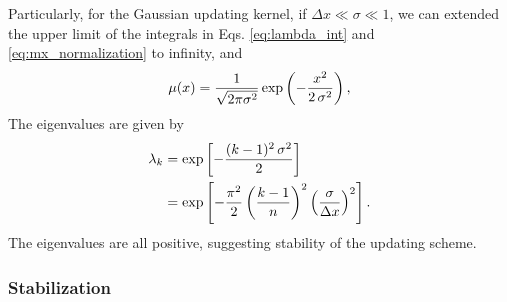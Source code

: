 \documentclass[reprint, floatfix]{revtex4-1}
\begin{document}
Particularly,
for the Gaussian updating kernel,
if $\Delta x \ll \sigma \ll 1$,
we can extended
the upper limit of the integrals
in Eqs. \eqref{eq:lambda_int}
and \eqref{eq:mx_normalization}
to infinity, and
%
\begin{equation}
\mu(x)
=
\frac{            1            }
     { \sqrt{ 2 \pi \sigma^2 } }
%
\exp\left(
      -\frac{       x^2     }
            { 2 \, \sigma^2 }
    \right),
\notag
\end{equation}
%
%
The eigenvalues are given by
%
\begin{align}
\lambda_k
&=
\exp\left[
      -\frac{ (k - 1)^2 \, \sigma^2 }
            {           2           }
    \right]
\notag
\\
&=
\exp\left[
      -\frac{ \pi^2 }{ 2 }
      \left(
        \frac{ k - 1 }
             {   n   }
      \right)^2
      \left(
        \frac{  \sigma }
             { \Delta x }
      \right)^2
    \right]
.
\notag
\end{align}
%
The eigenvalues are all positive,
suggesting stability of the updating scheme.





\subsubsection{\label{sec:stabilize_wband}
Stabilization}
\end{document}
